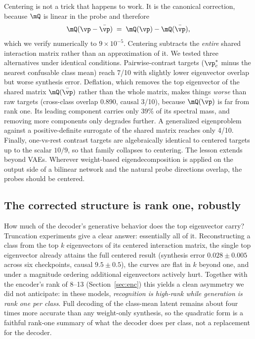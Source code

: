 \documentclass[10pt]{article} %
\begin{document}
Centering is not a trick that happens to work. It is the canonical correction,
because $\mQ$ is linear in the probe and therefore
\begin{equation}
  \mQ(\vp - \bar{\vp}) \;=\; \mQ(\vp) - \mQ(\bar{\vp}),
\end{equation}
which we verify numerically to $9 \times 10^{-5}$. Centering subtracts the
\emph{entire} shared interaction matrix rather than an approximation of it. We
tested three alternatives under identical conditions. Pairwise-contrast targets
($\vp^*_c$ minus the nearest confusable class mean) reach 7/10 with slightly lower
eigenvector overlap but worse synthesis error. Deflation, which removes the top
eigenvector of the shared matrix $\mQ(\bar{\vp})$ rather than the whole matrix,
makes things \emph{worse} than raw targets (cross-class overlap 0.890, causal
3/10), because $\mQ(\bar{\vp})$ is far from rank one. Its leading component carries
only 39\% of its spectral mass, and removing more components only degrades further.
A generalized eigenproblem against a positive-definite surrogate of the shared
matrix reaches only 4/10. Finally, one-vs-rest contrast targets are algebraically
identical to centered targets up to the scalar $10/9$, so that family collapses to
centering. The lesson extends beyond VAEs. Wherever weight-based eigendecomposition
is applied on the output side of a bilinear network and the natural probe
directions overlap, the probes should be centered.

\subsection{The corrected structure is rank one, robustly}
\label{sec:rank}

How much of the decoder's generative behavior does the top eigenvector carry?
Truncation experiments give a clear answer: essentially all of it. Reconstructing a
class from the top $k$ eigenvectors of its centered interaction matrix, the single
top eigenvector already attains the full centered result (synthesis error
$0.028 \pm 0.005$ across six checkpoints, causal $9.5 \pm 0.5$), the curves are flat
in $k$ beyond one, and under a magnitude ordering additional eigenvectors actively
hurt. Together with the encoder's rank of 8--13 (Section~\ref{sec:enc}) this yields
a clean asymmetry we did not anticipate: in these models, \emph{recognition is
high-rank while generation is rank one per class}. Full decoding of the class-mean
latent remains about four times more accurate than any weight-only synthesis, so the
quadratic form is a faithful rank-one summary of what the decoder does per class,
not a replacement for the decoder.
\end{document}
